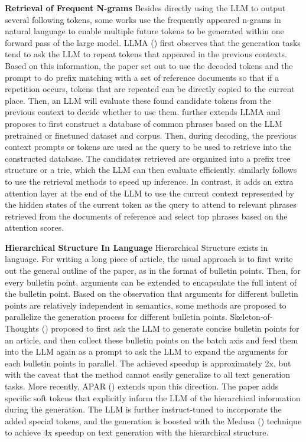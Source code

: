 \textbf{Retrieval of Frequent N-grams} Besides directly using the LLM to output several following tokens, some works use the frequently appeared n-grams in natural language to enable multiple future tokens to be generated within one forward pass of the large model. LLMA (\cite{yang2023inference}) first observes that the generation tasks tend to ask the LLM to repeat tokens that appeared in the previous contexts. Based on this information, the paper set out to use the decoded tokens and the prompt to do prefix matching with a set of reference documents so that if a repetition occurs, tokens that are repeated can be directly copied to the current place. Then, an LLM will evaluate these found candidate tokens from the previous context to decide whether to use them. \cite{he2023rest} further extends LLMA and proposes to first construct a database of common phrases based on the LLM pretrained or finetuned dataset and corpus. Then, during decoding, the previous context prompts or tokens are used as the query to be used to retrieve into the constructed database. The candidates retrieved are organized into a prefix tree structure or a trie, which the LLM can then evaluate efficiently. \cite{lan2023copy} similarly follows to use the retrieval methods to speed up inference. In contrast, it adds an extra attention layer at the end of the LLM to use the current context represented by the hidden states of the current token as the query to attend to relevant phrases retrieved from the documents of reference and select top phrases based on the attention scores. 

\textbf{Hierarchical Structure In Language} Hierarchical Structure exists in language. For writing a long piece of article, the usual approach is to first write out the general outline of the paper, as in the format of bulletin points. Then, for every bulletin point, arguments can be extended to encapsulate the full intent of the bulletin point. Based on the observation that arguments for different bulletin points are relatively independent in semantics, some methods are proposed to parallelize the generation process for different bulletin points. Skeleton-of-Thoughts (\cite{ning2023skeletonofthought}) proposed to first ask the LLM to generate concise bulletin points for an article, and then collect these bulletin points on the batch axis and feed them into the LLM again as a prompt to ask the LLM to expand the arguments for each bulletin points in parallel. The achieved speedup is approximately 2x, but with the caveat that the method cannot easily generalize to all text generation tasks. More recently, APAR (\cite{liu2024apar}) extends upon this direction. The paper adds specific soft tokens that explicitly inform the LLM of the hierarchical information during the generation. The LLM is further instruct-tuned to incorporate the added special tokens, and the generation is boosted with the Medusa (\cite{cai2024medusa}) technique to achieve 4x speedup on text generation with the hierarchical structure. 

